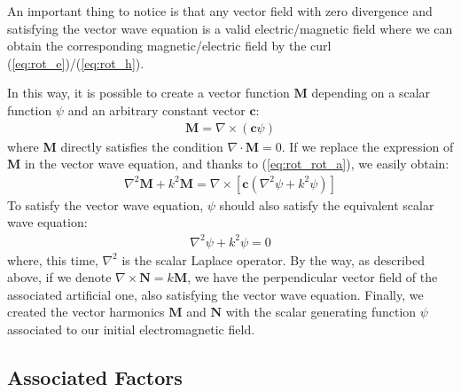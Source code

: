 \documentclass{article}
\numberwithin{equation}{section}
\begin{document}
An important thing to notice is that any vector field with zero divergence and satisfying the vector wave equation is a valid electric/magnetic field where we can obtain the corresponding magnetic/electric field by the curl (\ref{eq:rot_e})/(\ref{eq:rot_h}).

In this way, it is possible to create a vector function $\textbf{M}$ depending on a scalar function $\psi$ and an arbitrary constant vector $\textbf{c}$:
\begin{align}
\textbf{M} = \nabla \times (\textbf{c}\psi)
\end{align}
where \textbf{M} directly satisfies the condition $\nabla \cdot \textbf{M} = 0$. If we replace the expression of \textbf{M} in the vector wave equation, and thanks to (\ref{eq:rot_rot_a}), we easily obtain:
\begin{align}
\nabla ^{2} \textbf{M} + k^{2}\textbf{M} = \nabla \times [\textbf{c}(\nabla ^{2} \psi + k^{2}\psi)]
\end{align}
To satisfy the vector wave equation, $\psi$ should also satisfy the equivalent scalar wave equation:
\begin{align}\label{eq:psi_wave_eq}
\nabla ^{2} \psi + k^{2}\psi = 0
\end{align}
where, this time, $\nabla ^{2}$ is the scalar Laplace operator. By the way, as described above, if we denote $\nabla \times \textbf{N} = k \textbf{M}$, we have the perpendicular vector field of the associated artificial one, also satisfying the vector wave equation. Finally, we created the vector harmonics $\textbf{M}$ and $\textbf{N}$ with the scalar generating function $\psi$ associated to our initial electromagnetic field.

\subsection{Associated Factors}
\end{document}
